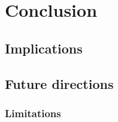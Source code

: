\chapter{Conclusion}
  \section{Implications}
  \section{Future directions}
    \subsection{Limitations}